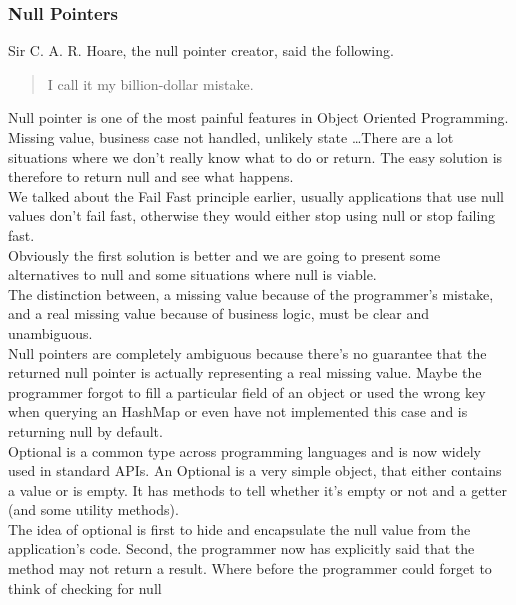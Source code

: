 \subsubsection{Null Pointers}
Sir C. A. R. Hoare, the null pointer creator, said the following.
\begin{quotation}
    I call it my billion-dollar mistake.
\end{quotation}
Null pointer is one of the most painful features in Object Oriented
Programming.
Missing value, business case not handled, unlikely state \ldots There are
a lot situations where we don't really know what to do or return.
The easy solution is therefore to return null and see what happens. \\
We talked about the Fail Fast principle earlier, usually applications
that use null values don't fail fast, otherwise they would either
stop using null or stop failing fast. \\
Obviously the first solution is better and we are going to present some
alternatives to null and some situations where null is viable. \\
\newline
The distinction between, a missing value because of the
programmer's mistake, and a real missing value because of business logic,
must be clear and unambiguous. \\
Null pointers are completely ambiguous because there's no guarantee that
the returned null pointer is actually representing a real missing value.
Maybe the programmer forgot to fill a particular field of an object
or used the wrong key when querying an HashMap or even have not
implemented this case and is returning null by default.
\\
\newline
Optional is a common type across programming languages and is now widely
used in standard APIs.
An Optional is a very simple object, that either contains a value or
is empty.
It has methods to tell whether it's empty or not and a getter (and some
utility methods). \\
The idea of optional is first to hide and encapsulate the null value
from the application's code.
Second, the programmer now has explicitly said that the method may not
return a result.
Where before the programmer could forget to think of checking for null
